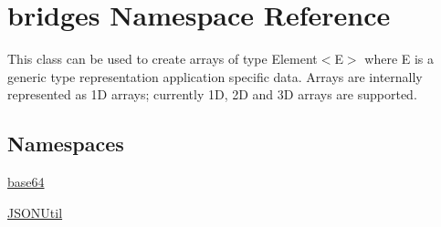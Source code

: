\hypertarget{namespacebridges}{}\section{bridges Namespace Reference}
\label{namespacebridges}


This class can be used to create arrays of type Element$<$\+E$>$ where E is a generic type representation application specific data. Arrays are internally represented as 1D arrays; currently 1D, 2D and 3D arrays are supported.  


\subsection*{Namespaces}
\begin{DoxyCompactItemize}
\item 
 \mbox{\hyperlink{namespacebridges_1_1base64}{base64}}
\item 
 \mbox{\hyperlink{namespacebridges_1_1_j_s_o_n_util}{J\+S\+O\+N\+Util}}
\end{DoxyCompactItemize}
